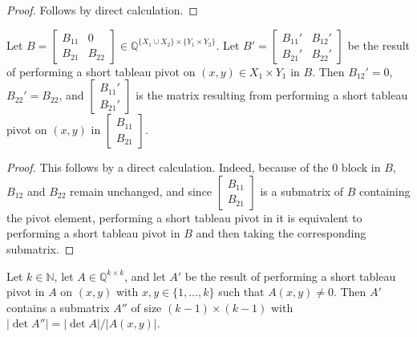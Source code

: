 \begin{proof}
    \leanok
    Follows by direct calculation.
\end{proof}

\begin{lemma}
    \label{Matrix.shortTableauPivot_zero}
    \leanok
    Let $B = \begin{bmatrix} B_{11} & 0 \\ B_{21} & B_{22} \end{bmatrix} \in \mathbb{Q}^{\{X_{1} \cup X_{2}\} \times \{Y_{1} \times Y_{2}\}}$. Let $B' = \begin{bmatrix} B_{11}' & B_{12}' \\ B_{21}' & B_{22}' \end{bmatrix}$ be the result of performing a short tableau pivot on $(x, y) \in X_{1} \times Y_{1}$ in $B$. Then $B_{12}' = 0$, $B_{22}' = B_{22}$, and $\begin{bmatrix} B_{11}' \\ B_{21}' \end{bmatrix}$ is the matrix resulting from performing a short tableau pivot on $(x, y)$ in $\begin{bmatrix} B_{11} \\ B_{21} \end{bmatrix}$.
\end{lemma}

\begin{proof}
    \leanok
    This follows by a direct calculation. Indeed, because of the $0$ block in $B$, $B_{12}$ and $B_{22}$ remain unchanged, and since $\begin{bmatrix} B_{11} \\ B_{21} \end{bmatrix}$ is a submatrix of $B$ containing the pivot element, performing a short tableau pivot in it is equivalent to performing a short tableau pivot in $B$ and then taking the corresponding submatrix.
\end{proof}

\begin{lemma}
    \label{shortTableauPivot_submatrix_det_abs_eq_div}
    \leanok
    Let $k \in \mathbb{N}$, let $A \in \mathbb{Q}^{k \times k}$, and let $A'$ be the result of performing a short tableau pivot in $A$ on $(x, y)$ with $x, y \in \{1, \dots, k\}$ such that $A (x, y) \neq 0$. Then $A'$ contains a submatrix $A''$ of size $(k - 1) \times (k - 1)$ with $|\det A''| = |\det A| / |A (x, y)|$.
\end{lemma}

